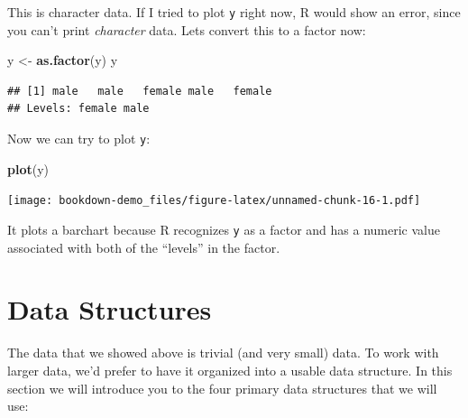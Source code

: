 \documentclass[]{book}
\newenvironment{Shaded}{\begin{snugshade}}{\end{snugshade}}
\newcommand{\KeywordTok}[1]{\textcolor[rgb]{0.13,0.29,0.53}{\textbf{{#1}}}}
\newcommand{\StringTok}[1]{\textcolor[rgb]{0.31,0.60,0.02}{{#1}}}
\newcommand{\NormalTok}[1]{{#1}}
\begin{document}
This is character data. If I tried to plot \texttt{y} right now, R would
show an error, since you can't print \emph{character} data. Lets convert
this to a factor now:

\begin{Shaded}
\begin{Highlighting}[]
\NormalTok{y <-}\StringTok{ }\KeywordTok{as.factor}\NormalTok{(y)}
\NormalTok{y}
\end{Highlighting}
\end{Shaded}

\begin{verbatim}
## [1] male   male   female male   female
## Levels: female male
\end{verbatim}

Now we can try to plot \texttt{y}:

\begin{Shaded}
\begin{Highlighting}[]
\KeywordTok{plot}\NormalTok{(y)}
\end{Highlighting}
\end{Shaded}

\texttt{[image: bookdown-demo\_files/figure-latex/unnamed-chunk-16-1.pdf]}

It plots a barchart because R recognizes \texttt{y} as a factor and has
a numeric value associated with both of the ``levels'' in the factor.

\section{Data Structures}\label{data-structures}

The data that we showed above is trivial (and very small) data. To work
with larger data, we'd prefer to have it organized into a usable data
structure. In this section we will introduce you to the four primary
data structures that we will use:
\end{document}
